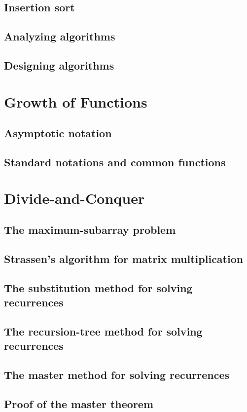 \documentclass[a4paper]{article}
\begin{document}
\subsection{Insertion sort}
\subsection{Analyzing algorithms}
\subsection{Designing algorithms}

\newpage
\section{Growth of Functions}
\subsection{Asymptotic notation}
\subsection{Standard notations and common functions}

\newpage
\section{Divide-and-Conquer}
\subsection{The maximum-subarray problem}
\subsection{Strassen’s algorithm for matrix multiplication}
\subsection{The substitution method for solving recurrences}
\subsection{The recursion-tree method for solving recurrences}
\subsection{The master method for solving recurrences}
\subsection{Proof of the master theorem}
\end{document}
